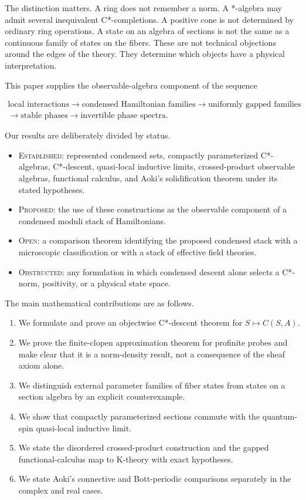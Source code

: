 \documentclass[12pt]{article}
\theoremstyle{definition}
\theoremstyle{remark}
\newcommand{\Status}[1]{\textsc{#1}}
\begin{document}
The distinction matters.  A ring does not remember a norm.  A *-algebra may admit
several inequivalent C*-completions.  A positive cone is not determined by ordinary
ring operations.  A state on an algebra of sections is not the same as a continuous
family of states on the fibers.  These are not technical objections around the
edges of the theory.  They determine which objects have a physical interpretation.

This paper supplies the observable-algebra component of the sequence

\[
\begin{gathered}
\text{local interactions}
\longrightarrow
\text{condensed Hamiltonian families}
\longrightarrow
\text{uniformly gapped families}
\\
\longrightarrow
\text{stable phases}
\longrightarrow
\text{invertible phase spectra}.
\end{gathered}
\]

Our results are deliberately divided by status.

\begin{itemize}[leftmargin=2em]
\item \Status{Established}: represented condensed sets, compactly parameterized
  C*-algebras, C*-descent, quasi-local inductive limits, crossed-product observable
  algebras, functional calculus, and Aoki's solidification theorem under its stated
  hypotheses.
\item \Status{Proposed}: the use of these constructions as the observable component
  of a condensed moduli stack of Hamiltonians.
\item \Status{Open}: a comparison theorem identifying the proposed condensed stack
  with a microscopic classification or with a stack of effective field theories.
\item \Status{Obstructed}: any formulation in which condensed descent alone selects
  a C*-norm, positivity, or a physical state space.
\end{itemize}

The main mathematical contributions are as follows.

\begin{enumerate}[leftmargin=2em]
\item We formulate and prove an objectwise C*-descent theorem for $S\mapsto C(S,A)$.
\item We prove the finite-clopen approximation theorem for profinite probes and make
  clear that it is a norm-density result, not a consequence of the sheaf axiom alone.
\item We distinguish external parameter families of fiber states from states on a
  section algebra by an explicit counterexample.
\item We show that compactly parameterized sections commute with the quantum-spin
  quasi-local inductive limit.
\item We state the disordered crossed-product construction and the gapped
  functional-calculus map to K-theory with exact hypotheses.
\item We state Aoki's connective and Bott-periodic comparisons separately in the
  complex and real cases.
\end{enumerate}
\end{document}
